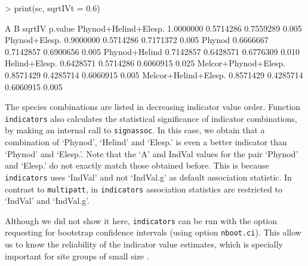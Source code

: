 \documentclass[11pt,a4paper]{article}
\begin{document}
\begin{Schunk}
\begin{Sinput}
> print(sc, sqrtIVt = 0.6)
\end{Sinput}
\begin{Soutput}
                             A         B    sqrtIV p.value
Phynod+Helind+Elesp. 1.0000000 0.5714286 0.7559289   0.005
Phynod+Elesp.        0.9000000 0.5714286 0.7171372   0.005
Phynod               0.6666667 0.7142857 0.6900656   0.005
Phynod+Helind        0.7142857 0.6428571 0.6776309   0.010
Helind+Elesp.        0.6428571 0.5714286 0.6060915   0.025
Melcor+Phynod+Elesp. 0.8571429 0.4285714 0.6060915   0.005
Melcor+Helind+Elesp. 0.8571429 0.4285714 0.6060915   0.005
\end{Soutput}
\end{Schunk}
The species combinations are listed in decreasing indicator value order. Function \texttt{indicators} also calculates the statistical significance of indicator combinations, by making an internal call to \texttt{signassoc}. In this case, we obtain that a combination of `Phynod', `Helind' and `Elesp.' is even a better indicator than `Phynod' and `Elesp.'. Note that the `A' and IndVal values for the pair `Phynod' and `Elesp.' do not exactly match those obtained before. This is because \texttt{indicators} uses `IndVal' and not `IndVal.g' as default association statistic. In contrast to \texttt{multipatt}, in \texttt{indicators} association statistics are restricted to `IndVal' and `IndVal.g'.

Although we did not show it here, \texttt{indicators} can be run with the option requesting for bootstrap confidence intervals (using option \texttt{nboot.ci}). This allow us to know the reliability of the indicator value estimates, which is specially important for site groups of small size \citep{DeCaceres2012}.
\end{document}
